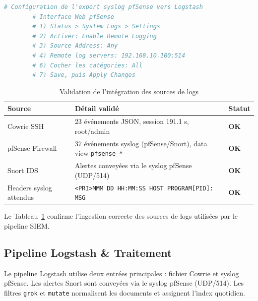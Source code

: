 \documentclass[12pt,a4paper,openany]{report}
\newcommand{\tableheadcolor}{\rowcolor{tableheadbg}}
\begin{document}
	\begin{lstlisting}[language=bash, caption={Configuration pfSense -> ELK (étapes exactes)}]
		# Configuration de l'export syslog pfSense vers Logstash
		# Interface Web pfSense
		# 1) Status > System Logs > Settings
		# 2) Activer: Enable Remote Logging
		# 3) Source Address: Any
		# 4) Remote log servers: 192.168.10.100:514
		# 6) Cocher les catégories: All
		# 7) Save, puis Apply Changes
	\end{lstlisting}
	
	\begin{table}[H]
		\centering
		\small
		\renewcommand{\arraystretch}{1.25}
		\begin{tabular}{p{3.4cm} p{4.2cm} p{4.6cm}}
			\arrayrulecolor{tableborder}
			\hline
			\tableheadcolor
			\textcolor{tableheadfg}{\textbf{Source}} &
			\textcolor{tableheadfg}{\textbf{Détail validé}} &
			\textcolor{tableheadfg}{\textbf{Statut}} \\
			\hline
			\rowcolor{tablerowalt}
			Cowrie SSH & 23 événements JSON, session 191.1 s, root/admin & \textcolor{green!50!black}{\textbf{OK}} \\
			pfSense Firewall & 37 événements syslog (pfSense/Snort), data view \texttt{pfsense-*} & \textcolor{green!50!black}{\textbf{OK}} \\
			\rowcolor{tablerowalt}
			Snort IDS & Alertes conveyées via le syslog pfSense (UDP/514) & \textcolor{green!50!black}{\textbf{OK}} \\
			Headers syslog attendus & \texttt{<PRI>MMM DD HH:MM:SS HOST PROGRAM[PID]: MSG} & \textcolor{green!50!black}{\textbf{OK}} \\
			\hline
		\end{tabular}
		\caption{Validation de l'intégration des sources de logs}
		\label{tab:elk-sources-validation}
	\end{table}
	Le Tableau~\ref{tab:elk-sources-validation} confirme l'ingestion correcte des sources de logs utilisées par le pipeline SIEM.
	
	\subsection{Pipeline Logstash \& Traitement}
	\label{sec:elk-pipeline}
	
	Le pipeline Logstash utilise deux entrées principales : fichier Cowrie et syslog pfSense. Les alertes Snort sont conveyées via le syslog pfSense (UDP/514). Les filtres \texttt{grok} et \texttt{mutate} normalisent les documents et assignent l'index quotidien.
	
\end{document}
